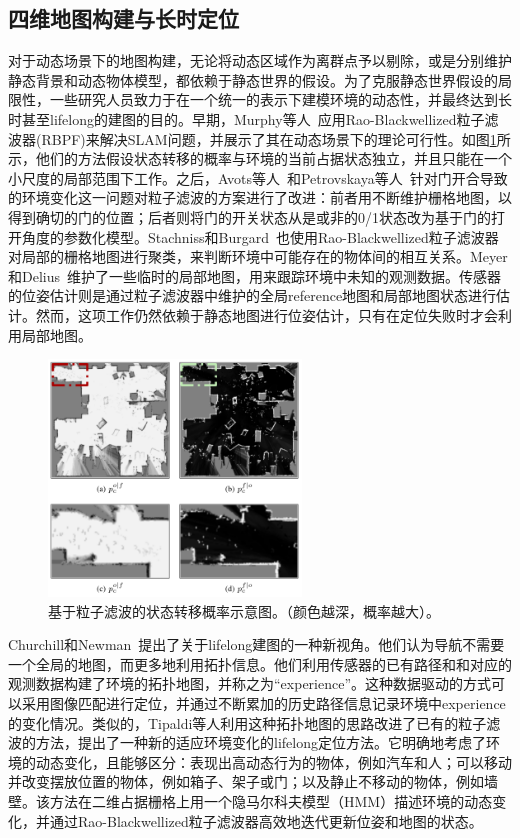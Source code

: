 \subsection{四维地图构建与长时定位}
\label{subsec:4Dmapping}
对于动态场景下的地图构建，无论将动态区域作为离群点予以剔除，或是分别维护静态背景和动态物体模型，都依赖于静态世界的假设。为了克服静态世界假设的局限性，一些研究人员致力于在一个统一的表示下建模环境的动态性，并最终达到长时甚至lifelong的建图的目的。早期，Murphy等人~\cite{Murphy1999Bayesian}应用Rao-Blackwellized粒子滤波器(RBPF)来解决SLAM问题，并展示了其在动态场景下的理论可行性。如图\ref{fig:State transition probabilities}所示，他们的方法假设状态转移的概率与环境的当前占据状态独立，并且只能在一个小尺度的局部范围下工作。之后，Avots等人~\cite{Avots2002A}和Petrovskaya等人~\cite{Petrovskaya2007Probabilistic}针对门开合导致的环境变化这一问题对粒子滤波的方案进行了改进：前者用不断维护栅格地图，以得到确切的门的位置；后者则将门的开关状态从是或非的0/1状态改为基于门的打开角度的参数化模型。Stachniss和Burgard~\cite{Stachniss2005Mobile}也使用Rao-Blackwellized粒子滤波器对局部的栅格地图进行聚类，来判断环境中可能存在的物体间的相互关系。Meyer和Delius~\cite{Meyer2010Temporary}维护了一些临时的局部地图，用来跟踪环境中未知的观测数据。传感器的位姿估计则是通过粒子滤波器中维护的全局reference地图和局部地图状态进行估计。然而，这项工作仍然依赖于静态地图进行位姿估计，只有在定位失败时才会利用局部地图。

\begin{figure}[htbp]
	\centering
	\includegraphics[width=0.6\textwidth]{figs/2-3/filter.png}
	\caption{基于粒子滤波的状态转移概率示意图。（颜色越深，概率越大）。}
	\label{fig:State transition probabilities}
\end{figure}

Churchill和Newman~\cite{Churchill2012Practice}提出了关于lifelong建图的一种新视角。他们认为导航不需要一个全局的地图，而更多地利用拓扑信息。他们利用传感器的已有路径和和对应的观测数据构建了环境的拓扑地图，并称之为“experience”。这种数据驱动的方式可以采用图像匹配进行定位，并通过不断累加的历史路径信息记录环境中experience的变化情况。类似的，Tipaldi等人\cite{Tipaldi2013Lifelong}利用这种拓扑地图的思路改进了已有的粒子滤波的方法，提出了一种新的适应环境变化的lifelong定位方法。它明确地考虑了环境的动态变化，且能够区分：表现出高动态行为的物体，例如汽车和人；可以移动并改变摆放位置的物体，例如箱子、架子或门；以及静止不移动的物体，例如墙壁。该方法在二维占据栅格上用一个隐马尔科夫模型（HMM）描述环境的动态变化，并通过Rao-Blackwellized粒子滤波器高效地迭代更新位姿和地图的状态。

